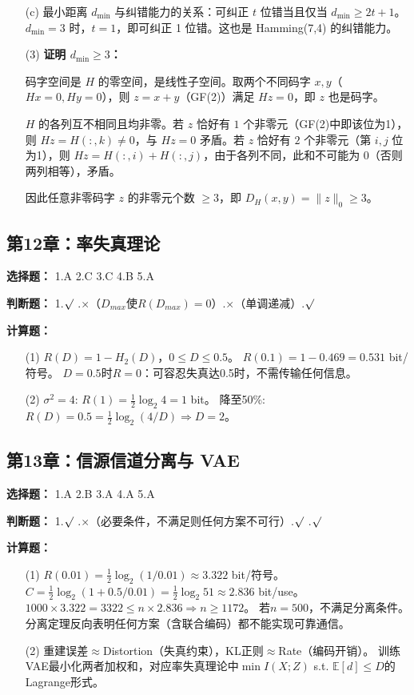 \documentclass[12pt,a4paper]{ctexart}
\newcommand{\EE}{\mathbb{E}}
\begin{document}
\begin{enumerate}[leftmargin=*]
(c) 最小距离 $d_{\min}$ 与纠错能力的关系：可纠正 $t$ 位错当且仅当 $d_{\min} \geq 2t+1$。\\
$d_{\min}=3$ 时，$t=1$，即可纠正 1 位错。这也是 Hamming(7,4) 的纠错能力。

\item[(3)] \textbf{证明 $d_{\min} \geq 3$：}

码字空间是 $H$ 的零空间，是线性子空间。取两个不同码字 $x,y$（$Hx=0, Hy=0$），则 $z=x+y$（GF(2)）满足 $Hz=0$，即 $z$ 也是码字。

$H$ 的各列互不相同且均非零。若 $z$ 恰好有 $1$ 个非零元（GF(2)中即该位为1），则 $Hz = H(:,k) \neq 0$，与 $Hz=0$ 矛盾。若 $z$ 恰好有 $2$ 个非零元（第 $i,j$ 位为1），则 $Hz = H(:,i) + H(:,j)$，由于各列不同，此和不可能为 $0$（否则两列相等），矛盾。

因此任意非零码字 $z$ 的非零元个数 $\geq 3$，即 $D_H(x,y) = \|z\|_0 \geq 3$。
\end{enumerate}

\subsection*{第12章：率失真理论}

\textbf{选择题：} 1.A \quad 2.C \quad 3.C \quad 4.B \quad 5.A

\textbf{判断题：} 1.$\surd$ .$\times$（$D_{max}$使$R(D_{max})=0$）.$\times$（单调递减）.$\surd$

\textbf{计算题：}
\begin{enumerate}[leftmargin=*]
\item[(1)] $R(D)=1-H_2(D)$，$0\leq D\leq0.5$。
$R(0.1)=1-0.469=0.531$ bit/符号。
$D=0.5$时$R=0$：可容忍失真达0.5时，不需传输任何信息。
\item[(2)] $\sigma^2=4$: $R(1)=\frac{1}{2}\log_2 4=1$ bit。
降至50\%: $R(D)=0.5=\frac{1}{2}\log_2(4/D)\Rightarrow D=2$。
\end{enumerate}

\subsection*{第13章：信源信道分离与 VAE}

\textbf{选择题：} 1.A \quad 2.B \quad 3.A \quad 4.A \quad 5.A

\textbf{判断题：} 1.$\surd$ .$\times$（必要条件，不满足则任何方案不可行）.$\surd$ .$\surd$

\textbf{计算题：}
\begin{enumerate}[leftmargin=*]
\item[(1)] $R(0.01)=\frac{1}{2}\log_2(1/0.01)\approx3.322$ bit/符号。
$C=\frac{1}{2}\log_2(1+0.5/0.01)=\frac{1}{2}\log_2 51\approx2.836$ bit/use。
$1000\times3.322=3322\leq n\times2.836\Rightarrow n\geq1172$。
若$n=500$，不满足分离条件。分离定理反向表明任何方案（含联合编码）都不能实现可靠通信。
\item[(2)] 重建误差$\approx$Distortion（失真约束），KL正则$\approx$Rate（编码开销）。
训练VAE最小化两者加权和，对应率失真理论中$\min I(X;Z)$ s.t. $\EE[d]\leq D$的Lagrange形式。
\end{enumerate}
\end{document}
